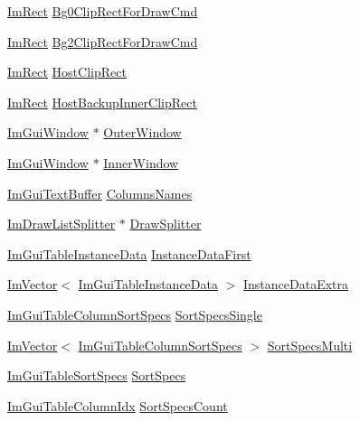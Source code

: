 \begin{DoxyCompactItemize}
\hyperlink{structImRect}{Im\+Rect} \hyperlink{structImGuiTable_a15d1df65b26a440ffbb941f30b11b948}{Bg0\+Clip\+Rect\+For\+Draw\+Cmd}
\item 
\hyperlink{structImRect}{Im\+Rect} \hyperlink{structImGuiTable_a166018c1f957586c14bc0ee081cc3125}{Bg2\+Clip\+Rect\+For\+Draw\+Cmd}
\item 
\hyperlink{structImRect}{Im\+Rect} \hyperlink{structImGuiTable_a478781580df4716cfe31e8d639c6f2c5}{Host\+Clip\+Rect}
\item 
\hyperlink{structImRect}{Im\+Rect} \hyperlink{structImGuiTable_a3a35f7340d466bac8239fd8f3c626ac2}{Host\+Backup\+Inner\+Clip\+Rect}
\item 
\hyperlink{structImGuiWindow}{Im\+Gui\+Window} $\ast$ \hyperlink{structImGuiTable_ab5a28e3ba666fece11feb5cdee2e1104}{Outer\+Window}
\item 
\hyperlink{structImGuiWindow}{Im\+Gui\+Window} $\ast$ \hyperlink{structImGuiTable_ad4cac002e07c96d3df71e37e3e81485e}{Inner\+Window}
\item 
\hyperlink{structImGuiTextBuffer}{Im\+Gui\+Text\+Buffer} \hyperlink{structImGuiTable_afb12197bd1ad6ae7317b6b0843eb3a60}{Columns\+Names}
\item 
\hyperlink{structImDrawListSplitter}{Im\+Draw\+List\+Splitter} $\ast$ \hyperlink{structImGuiTable_afeda8864273e89f4094a763398652d2a}{Draw\+Splitter}
\item 
\hyperlink{structImGuiTableInstanceData}{Im\+Gui\+Table\+Instance\+Data} \hyperlink{structImGuiTable_a0511f834ebfb52d3ace661fc1f6e82a6}{Instance\+Data\+First}
\item 
\hyperlink{structImVector}{Im\+Vector}$<$ \hyperlink{structImGuiTableInstanceData}{Im\+Gui\+Table\+Instance\+Data} $>$ \hyperlink{structImGuiTable_ae68a68cd4308506c90b3eebf535f388a}{Instance\+Data\+Extra}
\item 
\hyperlink{structImGuiTableColumnSortSpecs}{Im\+Gui\+Table\+Column\+Sort\+Specs} \hyperlink{structImGuiTable_ad111a9b0073e5061f2a847e9ad99519f}{Sort\+Specs\+Single}
\item 
\hyperlink{structImVector}{Im\+Vector}$<$ \hyperlink{structImGuiTableColumnSortSpecs}{Im\+Gui\+Table\+Column\+Sort\+Specs} $>$ \hyperlink{structImGuiTable_aba33a5c466948cb483b0b50c840dd422}{Sort\+Specs\+Multi}
\item 
\hyperlink{structImGuiTableSortSpecs}{Im\+Gui\+Table\+Sort\+Specs} \hyperlink{structImGuiTable_a8770e95686f57cfc9b61a037e95cc5b1}{Sort\+Specs}
\item 
\hyperlink{imgui__internal_8h_abe1882c8292cd23a77a54eda2407f147}{Im\+Gui\+Table\+Column\+Idx} \hyperlink{structImGuiTable_a72d50758681cecf127e6c9a44883ccfd}{Sort\+Specs\+Count}

\end{DoxyCompactItemize}
